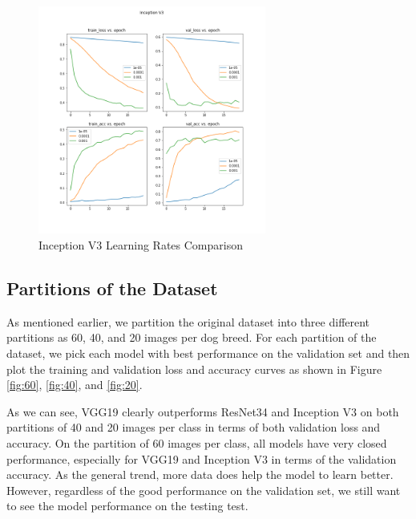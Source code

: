 \documentclass{article}
\begin{document}
\begin{figure}[h!]
    \centering
    \includegraphics[height=7.5cm]{Inception V3 LR.png}
    \caption{Inception V3 Learning Rates Comparison}
    \label{fig:lr_inc}
\end{figure}

\newpage
\subsection{Partitions of the Dataset}
As mentioned earlier, we partition the original dataset into three different partitions as 60, 40, and 20 images per dog breed. For each partition of the dataset, we pick each model with best performance on the validation set and then plot the training and validation loss and accuracy curves as shown in Figure \ref{fig:60}, \ref{fig:40}, and \ref{fig:20}.

As we can see, VGG19 clearly outperforms ResNet34 and Inception V3 on both partitions of 40 and 20 images per class in terms of both validation loss and accuracy. On the partition of 60 images per class, all models have very closed performance, especially for VGG19 and Inception V3 in terms of the validation accuracy. As the general trend, more data does help the model to learn better. However, regardless of the good performance on the validation set, we still want to see the model performance on the testing test.
\end{document}
